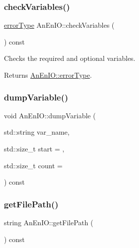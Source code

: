 \subsubsection{\texorpdfstring{check\+Variables()}{checkVariables()}}
{\footnotesize\ttfamily \mbox{\hyperlink{class_an_en_i_o_aa56bc1ec6610b86db4349bce20f9ead0}{error\+Type}} An\+En\+I\+O\+::check\+Variables (\begin{DoxyParamCaption}{ }\end{DoxyParamCaption}) const}

Checks the required and optional variables. \begin{DoxyReturn}{Returns}
\mbox{\hyperlink{class_an_en_i_o_aa56bc1ec6610b86db4349bce20f9ead0}{An\+En\+I\+O\+::error\+Type}}. 
\end{DoxyReturn}
\mbox{\label{class_an_en_i_o_acd5682e81361d75ff5566ae1df5fa023}} 
\subsubsection{\texorpdfstring{dump\+Variable()}{dumpVariable()}}
{\footnotesize\ttfamily void An\+En\+I\+O\+::dump\+Variable (\begin{DoxyParamCaption}\item[{std\+::string}]{var\+\_\+name,  }\item[{std\+::size\+\_\+t}]{start = {},  }\item[{std\+::size\+\_\+t}]{count = {} }\end{DoxyParamCaption}) const}

\mbox{\label{class_an_en_i_o_aae00624f6127c7946496443f5322ec8e}} 
\subsubsection{\texorpdfstring{get\+File\+Path()}{getFilePath()}}
{\footnotesize\ttfamily string An\+En\+I\+O\+::get\+File\+Path (\begin{DoxyParamCaption}{ }\end{DoxyParamCaption}) const}

\mbox{\label{class_an_en_i_o_a6f51b190d64895a4ad907abcf4a10b75}} 
